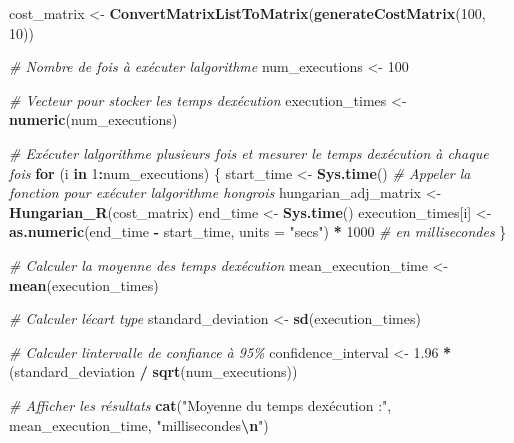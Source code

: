 \documentclass[
]{article}
\newenvironment{Shaded}{\begin{snugshade}}{\end{snugshade}}
\newcommand{\AttributeTok}[1]{\textcolor[rgb]{0.13,0.29,0.53}{#1}}
\newcommand{\CommentTok}[1]{\textcolor[rgb]{0.56,0.35,0.01}{\textit{#1}}}
\newcommand{\ControlFlowTok}[1]{\textcolor[rgb]{0.13,0.29,0.53}{\textbf{#1}}}
\newcommand{\DecValTok}[1]{\textcolor[rgb]{0.00,0.00,0.81}{#1}}
\newcommand{\FloatTok}[1]{\textcolor[rgb]{0.00,0.00,0.81}{#1}}
\newcommand{\FunctionTok}[1]{\textcolor[rgb]{0.13,0.29,0.53}{\textbf{#1}}}
\newcommand{\NormalTok}[1]{#1}
\newcommand{\OtherTok}[1]{\textcolor[rgb]{0.56,0.35,0.01}{#1}}
\newcommand{\SpecialCharTok}[1]{\textcolor[rgb]{0.81,0.36,0.00}{\textbf{#1}}}
\newcommand{\StringTok}[1]{\textcolor[rgb]{0.31,0.60,0.02}{#1}}
\begin{document}
\begin{Shaded}
\begin{Highlighting}[]
\NormalTok{cost\_matrix }\OtherTok{\textless{}{-}} \FunctionTok{ConvertMatrixListToMatrix}\NormalTok{(}\FunctionTok{generateCostMatrix}\NormalTok{(}\DecValTok{100}\NormalTok{, }\DecValTok{10}\NormalTok{))}

\CommentTok{\# Nombre de fois à exécuter l\textquotesingle{}algorithme}
\NormalTok{num\_executions }\OtherTok{\textless{}{-}} \DecValTok{100}

\CommentTok{\# Vecteur pour stocker les temps d\textquotesingle{}exécution}
\NormalTok{execution\_times }\OtherTok{\textless{}{-}} \FunctionTok{numeric}\NormalTok{(num\_executions)}

\CommentTok{\# Exécuter l\textquotesingle{}algorithme plusieurs fois et mesurer le temps d\textquotesingle{}exécution à chaque fois}
\ControlFlowTok{for}\NormalTok{ (i }\ControlFlowTok{in} \DecValTok{1}\SpecialCharTok{:}\NormalTok{num\_executions) \{}
\NormalTok{  start\_time }\OtherTok{\textless{}{-}} \FunctionTok{Sys.time}\NormalTok{()}
  \CommentTok{\# Appeler la fonction pour exécuter l\textquotesingle{}algorithme hongrois}
\NormalTok{  hungarian\_adj\_matrix }\OtherTok{\textless{}{-}} \FunctionTok{Hungarian\_R}\NormalTok{(cost\_matrix)}
\NormalTok{  end\_time }\OtherTok{\textless{}{-}} \FunctionTok{Sys.time}\NormalTok{()}
\NormalTok{  execution\_times[i] }\OtherTok{\textless{}{-}} \FunctionTok{as.numeric}\NormalTok{(end\_time }\SpecialCharTok{{-}}\NormalTok{ start\_time, }\AttributeTok{units =} \StringTok{"secs"}\NormalTok{) }\SpecialCharTok{*} \DecValTok{1000}  \CommentTok{\# en millisecondes}
\NormalTok{\}}

\CommentTok{\# Calculer la moyenne des temps d\textquotesingle{}exécution}
\NormalTok{mean\_execution\_time }\OtherTok{\textless{}{-}} \FunctionTok{mean}\NormalTok{(execution\_times)}

\CommentTok{\# Calculer l\textquotesingle{}écart type}
\NormalTok{standard\_deviation }\OtherTok{\textless{}{-}} \FunctionTok{sd}\NormalTok{(execution\_times)}

\CommentTok{\# Calculer l\textquotesingle{}intervalle de confiance à 95\%}
\NormalTok{confidence\_interval }\OtherTok{\textless{}{-}} \FloatTok{1.96} \SpecialCharTok{*}\NormalTok{ (standard\_deviation }\SpecialCharTok{/} \FunctionTok{sqrt}\NormalTok{(num\_executions))}

\CommentTok{\# Afficher les résultats}
\FunctionTok{cat}\NormalTok{(}\StringTok{"Moyenne du temps d\textquotesingle{}exécution :"}\NormalTok{, mean\_execution\_time, }\StringTok{"millisecondes}\SpecialCharTok{\textbackslash{}n}\StringTok{"}\NormalTok{)}
\end{Highlighting}
\end{Shaded}
\end{document}
